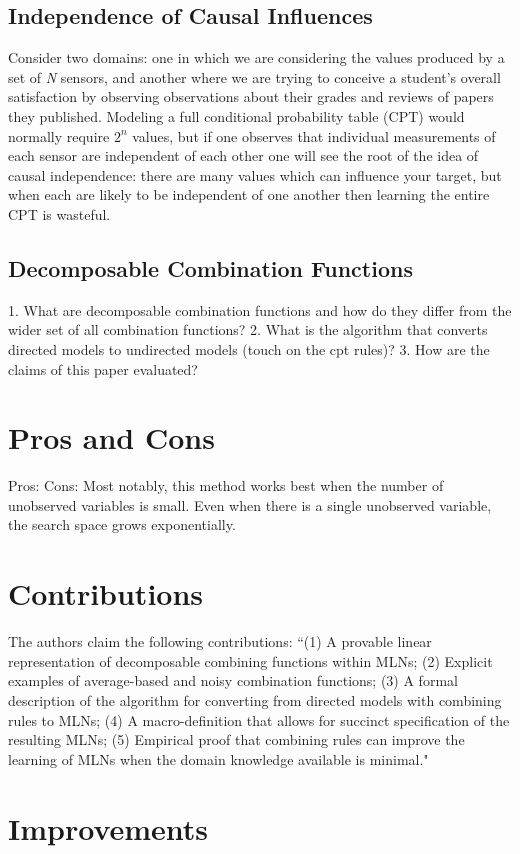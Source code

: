 \documentclass[letterpaper]{article}
\begin{document}
\subsection{Independence of Causal Influences}

Consider two domains: one in which we are considering the values produced by a set of \textit{N} sensors, and another where we are trying to conceive a student's overall satisfaction by observing observations about their grades and reviews of papers they published. Modeling a full conditional probability table (CPT) would normally require $2^n$ values, but if one observes that individual measurements of each sensor are independent of each other one will see the root of the idea of causal independence: there are many values which can influence your target, but when each are likely to be independent of one another then learning the entire CPT is wasteful.

\subsection{Decomposable Combination Functions}

1. What are decomposable combination functions and how do they differ from the wider set of all combination functions?
2. What is the algorithm that converts directed models to undirected models (touch on the cpt rules)?
3. How are the claims of this paper evaluated?

\section{Pros and Cons}

Pros:
Cons: Most notably, this method works best when the number of unobserved variables is small. Even when there is a single unobserved variable, the search space grows exponentially.

\section{Contributions}

The authors claim the following contributions: ``(1) A provable linear representation of decomposable combining functions within MLNs; (2) Explicit examples of average-based and noisy combination functions; (3) A formal description of the algorithm for converting from directed models with combining rules to MLNs; (4) A macro-definition that allows for succinct specification of the resulting MLNs; (5) Empirical proof that combining rules can improve the learning of MLNs when the domain knowledge available is minimal."

\section{Improvements}
\end{document}
